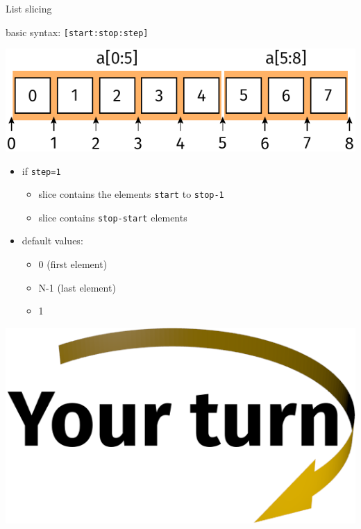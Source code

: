 \documentclass[svgnames]{beamer}
\begin{document}
\begin{frame}{List slicing}

 basic syntax: \texttt{[start:stop:step]}

 \vspace{0.2truecm}
 \begin{center}
  \includegraphics[width=\textwidth]{listindexing1}
 \end{center}
 \begin{itemize}
  \item if \texttt{step=1}
  \begin{itemize}
      \item slice contains the elements \texttt{start} to \texttt{stop-1}
      \item slice contains \texttt{stop-start} elements
  \end{itemize}
  \item default values:
  \begin{itemize}
      \item {} 0 (first element)
      \item {} N-1 (last element)
      \item {} 1
  \end{itemize}
 \end{itemize}
\end{frame}

\begin{frame}
 \begin{center}

  \vspace{0.5truecm}
  \includegraphics[width=3truecm]{yourturn}
 \end{center}
\end{frame}
\end{document}
